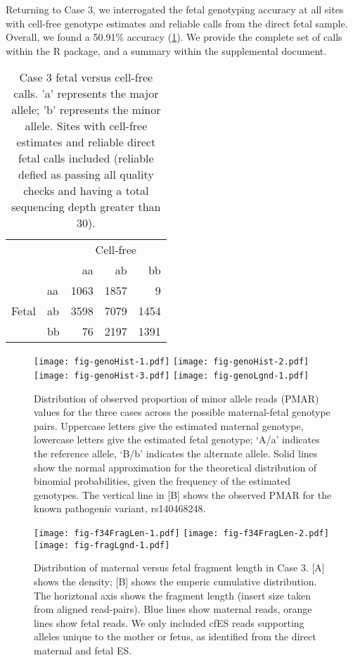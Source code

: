 \documentclass{article}\usepackage[]{graphicx}\usepackage[]{color}
\begin{document}
Returning to Case 3, we interrogated the fetal genotyping accuracy at all sites with cell-free genotype estimates and reliable calls from the direct fetal sample.
Overall, we found a 50.91\% accuracy (\cref{tab:c3calls}).
We provide the complete set of calls within the R package, and a summary within the supplemental document.

\begin{table}
  \centering
  \begin{tabular}{llrrr}
  \toprule
   & & \multicolumn{3}{c}{Cell-free} \\
   & & aa & ab & bb \\
   \midrule
   \multirow{3}{*}{Fetal} & aa & 1063 & 1857 & 9 \\
   & ab & 3598 & 7079 & 1454 \\
   & bb & 76 & 2197 & 1391 \\
  \bottomrule
  \end{tabular}
  \caption{Case 3 fetal versus cell-free calls. 'a' represents the major allele; 'b' represents the minor allele. Sites with cell-free estimates and reliable direct fetal calls included (reliable defied as passing all quality checks and having a total sequencing depth greater than 30).}
  \label{tab:c3calls}
\end{table}

\begin{figure}
  \centering
  \texttt{[image: fig-genoHist-1.pdf]}%
  \texttt{[image: fig-genoHist-2.pdf]}%
  \texttt{[image: fig-genoHist-3.pdf]}
  \texttt{[image: fig-genoLgnd-1.pdf]}
  \caption{Distribution of observed proportion of minor allele reads (PMAR) values for the three cases across the possible maternal-fetal genotype pairs. Uppercase letters give the estimated maternal genotype, lowercase letters give the estimated fetal genotype; `A/a' indicates the reference allele, `B/b' indicates the alternate allele. Solid lines show the normal approximation for the theoretical distribution of binomial probabilities, given the frequency of the estimated genotypes. The vertical line in [B] shows the observed PMAR for the known pathogenic variant, rs140468248.}
  \label{fig:genoHist}
\end{figure}

\begin{figure}
  \centering
  \texttt{[image: fig-f34FragLen-1.pdf]}%
  \texttt{[image: fig-f34FragLen-2.pdf]}
  \texttt{[image: fig-fragLgnd-1.pdf]}
  \caption{Distribution of maternal versus fetal fragment length in Case 3. [A] shows the density; [B] shows the emperic cumulative distribution. The horiztonal axis shows the fragment length (insert size taken from aligned read-pairs). Blue lines show maternal reads, orange lines show fetal reads. We only included cfES reads supporting alleles unique to the mother or fetus, as identified from the direct maternal and fetal ES.}
  \label{fig:c3fragLen}
\end{figure}
\end{document}
